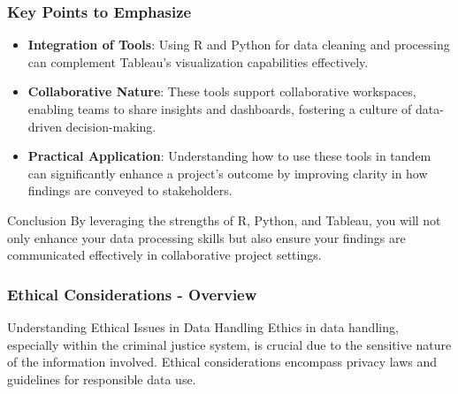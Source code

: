 \documentclass[aspectratio=169]{beamer}
\begin{document}
\begin{frame}[fragile]
    \frametitle{Key Points to Emphasize}
    \begin{itemize}
        \item \textbf{Integration of Tools}: Using R and Python for data cleaning and processing can complement Tableau's visualization capabilities effectively.
        \item \textbf{Collaborative Nature}: These tools support collaborative workspaces, enabling teams to share insights and dashboards, fostering a culture of data-driven decision-making.
        \item \textbf{Practical Application}: Understanding how to use these tools in tandem can significantly enhance a project’s outcome by improving clarity in how findings are conveyed to stakeholders.
    \end{itemize}
    \begin{block}{Conclusion}
        By leveraging the strengths of R, Python, and Tableau, you will not only enhance your data processing skills but also ensure your findings are communicated effectively in collaborative project settings.
    \end{block}
\end{frame}

\begin{frame}[fragile]
    \frametitle{Ethical Considerations - Overview}
    \begin{block}{Understanding Ethical Issues in Data Handling}
        Ethics in data handling, especially within the criminal justice system, is crucial due to the sensitive nature of the information involved. Ethical considerations encompass privacy laws and guidelines for responsible data use.
    \end{block}
\end{frame}
\end{document}
